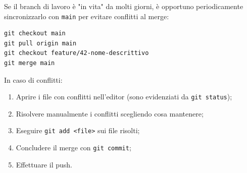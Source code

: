 Se il branch di lavoro è "in vita" da molti giorni, è opportuno periodicamente sincronizzarlo con \texttt{main} per evitare conflitti al merge:

\begin{lstlisting}
git checkout main
git pull origin main
git checkout feature/42-nome-descrittivo
git merge main
\end{lstlisting}

In caso di conflitti:

\begin{enumerate}
  \item Aprire i file con conflitti nell'editor (sono evidenziati da \texttt{git status});
  \item Risolvere manualmente i conflitti scegliendo cosa mantenere;
  \item Eseguire \texttt{git add <file>} sui file risolti;
  \item Concludere il merge con \texttt{git commit};
  \item Effettuare il push.
\end{enumerate}
